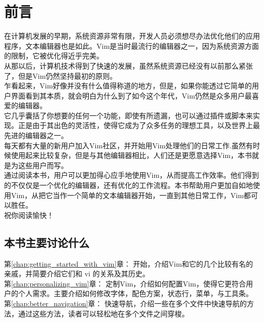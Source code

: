 \chapter{前言}
\label{chap:preface}
在计算机发展的早期，系统资源非常有限，开发人员必须想尽办法优化他们的应用程序，文本编辑器也是如此。Vim是当时最流行的编辑器之一，因为系统资源方面的限制，它被优化得近乎完美。\\

从那以后，计算机技术得到了快速的发展，虽然系统资源已经没有以前那么紧张了，但是Vim仍然坚持最初的原则。\\

乍看起来，Vim好像并没有什么值得称道的地方，但是，如果你能透过它简单的用户界面看到其本质，就会明白为什么到了如今这个年代，Vim仍然是众多用户最喜爱的编辑器。\\

它几乎囊括了你想要的任何一个功能，即使有所遗漏，也可以通过插件或脚本来实现。正是由于其出色的灵活性，使得它成为了众多任务的理想工具，以及世界上最先进的编辑器之一。\\

每天都有大量的新用户加入Vim社区，并开始用Vim处理他们的日常工作.虽然有时候使用起来比较复杂，但是与其他编辑器相比，人们还是更愿意选择Vim，本书就是为这些用户而写。\\

通过阅读本书，用户可以更加得心应手地使用Vim，从而提高工作效率。他们得到的不仅仅是一个优化的编辑器，还有优化的工作流程。本书帮助用户更加自如地使用Vim，从把它当作一个简单的文本编辑器开始，一直到其他日常工作，Vim都可以胜任。\\

祝你阅读愉快！

\section*{本书主要讨论什么}
第\ref{chap:getting_started_with_vim}章： 开始，介绍Vim和它的几个比较有名的亲戚，并简要介绍它们和 vi 的关系及其历史。\\

第\ref{chap:personalizing_vim}章： 定制Vim，介绍如何配置Vim，使得它更符合用户的个人需求。主要介绍如何修改字体，配色方案，状态行，菜单，与工具条。\\

第\ref{chap:better_navigation}章： 快速导航，介绍一些在多个文件中快速导航的方法，通过这些方法，读者可以轻松地在多个文件之间穿梭。\\


